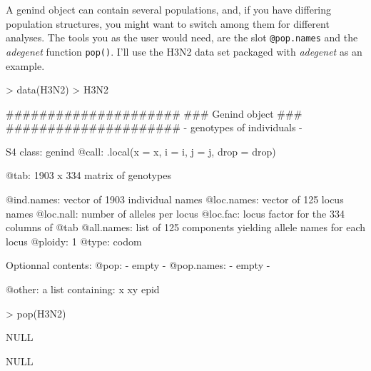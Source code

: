 \documentclass[letterpaper]{article}
\newcommand{\tab}{\hspace*{1em}}
\begin{document}
\tab\tab A genind object can contain several populations, and, if you have differing population structures, you might want to switch among them for different analyses. The tools you as the user would need, are the slot \texttt{@pop.names} and the \textit{adegenet} function \texttt{pop()}. I'll use the H3N2 data set packaged with \textit{adegenet} as an example.
\begin{Schunk}
\begin{Sinput}
> data(H3N2)
> H3N2
\end{Sinput}
\begin{Soutput}
   #####################
   ### Genind object ### 
   #####################
- genotypes of individuals - 

S4 class:  genind
@call: .local(x = x, i = i, j = j, drop = drop)

@tab:  1903 x 334 matrix of genotypes

@ind.names: vector of  1903 individual names
@loc.names: vector of  125 locus names
@loc.nall: number of alleles per locus
@loc.fac: locus factor for the  334 columns of @tab
@all.names: list of  125 components yielding allele names for each locus
@ploidy:  1
@type:  codom

Optionnal contents: 
@pop:  - empty -
@pop.names:  - empty -

@other: a list containing: x  xy  epid 
\end{Soutput}
\begin{Sinput}
> pop(H3N2)
\end{Sinput}
\begin{Soutput}
NULL
\end{Soutput}
\begin{Soutput}
NULL
\end{Soutput}
\end{Schunk}
\end{document}
